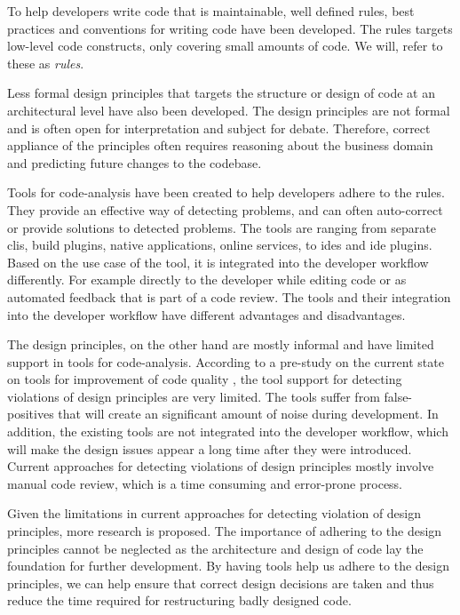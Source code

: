 \documentclass{report}
\begin{document}
To help developers write code that is maintainable, well defined rules, best practices and conventions for writing code have been developed. The rules targets low-level code constructs, only covering small amounts of code. We will, refer to these as \textit{rules}.

Less formal design principles that targets the structure or design of code at an architectural level have also been developed. The design principles are not formal and is often open for interpretation and subject for debate. Therefore, correct appliance of the principles often requires reasoning about the business domain and predicting future changes to the codebase. 

Tools for code-analysis have been created to help developers adhere to the rules. They provide an effective way of detecting problems, and can often auto-correct or provide solutions to detected problems. The tools are ranging from separate \gls{cli}s, build plugins, native applications, online services, to \gls{ide}s and \gls{ide} plugins. Based on the use case of the tool, it is integrated into the developer workflow differently. For example directly to the developer while editing code or as automated feedback that is part of a code review.  The tools and their integration into the developer workflow have different advantages and disadvantages.

The design principles, on the other hand are mostly informal and have limited support in tools for code-analysis. According to a pre-study on the current state on tools for improvement of code quality \cite{prestudy}, the tool support for detecting violations of design principles are very limited. The tools suffer from false-positives that will create an significant amount of noise during development. In addition, the existing tools are not integrated into the developer workflow, which will make the design issues appear a long time after they were introduced. Current approaches for detecting violations of design principles mostly involve manual code review, which is a time consuming and error-prone process.

Given the limitations in current approaches for detecting violation of design principles, more research is proposed. The importance of adhering to the design principles cannot be neglected as the architecture and design of code lay the foundation for further development. By having tools help us adhere to the design principles, we can help ensure that correct design decisions are taken and thus reduce the time required for restructuring badly designed code.  
\end{document}
